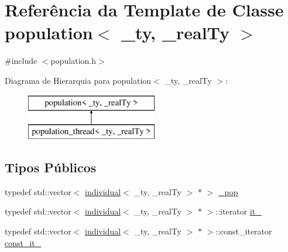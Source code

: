 \hypertarget{classpopulation}{
\section{Referência da Template de Classe population$<$ \_\-ty, \_\-realTy $>$}
\label{classpopulation}
}


{\ttfamily \#include $<$population.h$>$}

Diagrama de Hierarquia para population$<$ \_\-ty, \_\-realTy $>$:\begin{figure}[H]
\begin{center}
\leavevmode
\includegraphics[height=2cm]{classpopulation}
\end{center}
\end{figure}
\subsection*{Tipos Públicos}
\begin{DoxyCompactItemize}
\item 
typedef std::vector$<$ \hyperlink{classindividual}{individual}$<$ \_\-ty, \_\-realTy $>$ $\ast$ $>$ \hyperlink{classpopulation_a487317a079f4b94c650983ccbd0048a5}{\_\-pop}
\item 
typedef std::vector$<$ \hyperlink{classindividual}{individual}$<$ \_\-ty, \_\-realTy $>$ $\ast$ $>$::iterator \hyperlink{classpopulation_aa2f35e7dcc0553a7d2a96e5dca6105e0}{it\_\-}
\item 
typedef std::vector$<$ \hyperlink{classindividual}{individual}$<$ \_\-ty, \_\-realTy $>$ $\ast$ $>$::const\_\-iterator \hyperlink{classpopulation_afcea3753ae2b2e0211f8fdc919c51a71}{const\_\-it\_\-}
\end{DoxyCompactItemize}
